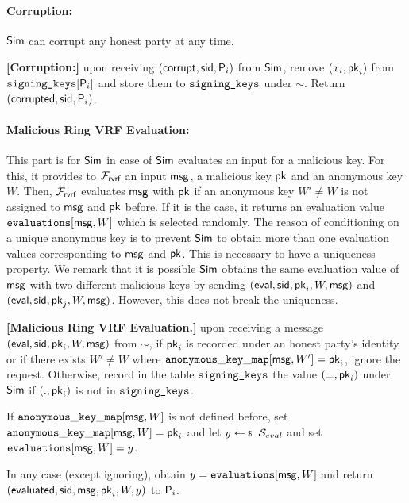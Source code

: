\paragraph{Corruption:} $ \mathsf{Sim} $ can corrupt any honest party at any time.  

\begin{tcolorbox}[left=2pt,right=2pt]
	\eprint{}{\scriptsize}
	\textbf{[Corruption:] } 
	upon receiving $ (\mathsf{corrupt}, \textsf{sid}, \mathsf{P}_i) $ from $ \mathsf{Sim} $, remove $ (x_i,\mathsf{pk}_i) $ from $ \texttt{signing\_keys}[\mathsf{P}_i] $ and store them to $ \texttt{signing\_keys} $ under $ \sim $. Return $ (\mathsf{corrupted}, \textsf{sid},\mathsf{P}_i) $.
\end{tcolorbox}

\paragraph{Malicious Ring VRF Evaluation:} This part  is for $ \mathsf{Sim} $ in case of $ \mathsf{Sim} $  evaluates an input for a malicious key. For this,  it  provides to $ \mathcal{F}_{\textsf{rvrf}} $ an input $ \mathsf{msg} $, a malicious key $ \mathsf{pk} $ and an anonymous key $ W $.  Then, $ \mathcal{F}_{\textsf{rvrf}} $ evaluates  $ \mathsf{msg} $ with $ \mathsf{pk} $ if an anonymous key $ W' \neq W$  is not assigned to $ \mathsf{msg} $ and $ \mathsf{pk} $ before.  If it is the case, it returns an evaluation value $ \texttt{evaluations}[\mathsf{msg}, W] $ which is selected randomly. The reason of conditioning on a unique anonymous key  is to prevent $ \mathsf{Sim} $ to obtain more than one evaluation values corresponding to $ \mathsf{msg} $ and $ \mathsf{pk} $. This is necessary to have a uniqueness property.
We remark that it is possible  $ \mathsf{Sim} $ obtains the same evaluation value of $ \mathsf{msg} $ with two different malicious  keys  by sending $ (\mathsf{eval}, \textsf{sid}, \mathsf{pk}_i, W, \mathsf{msg}) $ and $(\mathsf{eval}, \textsf{sid}, \mathsf{pk}_j, W, \mathsf{msg})$. However, this does not break the uniqueness.

\begin{tcolorbox}[left=2pt,right=2pt]
	\eprint{}{\scriptsize}
	\textbf{[Malicious Ring VRF Evaluation.]}  upon receiving a message $(\mathsf{eval}, \textsf{sid}, \mathsf{pk}_i, W, \mathsf{msg})$ from $\sim$, if $ \mathsf{pk}_i $ is recorded under an honest party's identity or if there exists $ W'\neq W $ where $ \mathtt{anonymous\_key\_map}[\mathsf{msg},W'] = \mathsf{pk}_i $, ignore the request.
	Otherwise, record in the table $\texttt{signing\_keys}$ the value $(\perp,\mathsf{pk}_i)$ under $\mathsf{Sim}$ if $ (.,\mathsf{pk}_i) $ is not in $ \texttt{signing\_keys} $.
	
	If  $\mathtt{anonymous\_key\_map}[\mathsf{msg},W]  $ is not defined before, set $ \mathtt{anonymous\_key\_map}[\mathsf{msg},W] = \mathsf{pk}_i $ and let   $y \leftsample \setsym{S}_{eval}$ and set $ \texttt{evaluations}[\mathsf{msg}, W] = y$.
	
	In any case (except ignoring), obtain $ y = \texttt{evaluations}[\mathsf{msg}, W] $ and return $(\mathsf{evaluated}, \textsf{sid},  \mathsf{msg}, \mathsf{pk}_i,W, y)$ to $ \mathsf{P}_i $.
\end{tcolorbox}

